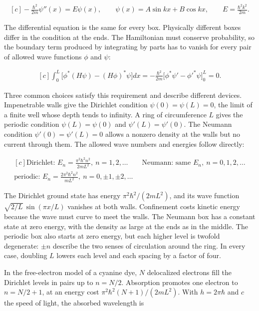 \documentclass[11pt,oneside]{book}
\newenvironment{centeredalign}{\[\begin{gathered}[c]}{\end{gathered}\]}
\begin{document}
\begin{centeredalign}
-\frac{\hbar^2}{2m}\psi''(x)=E\psi(x),\qquad
\psi(x)=A\sin kx+B\cos kx,\qquad E=\frac{\hbar^2k^2}{2m}.
\end{centeredalign}

The differential equation is the same for every box. Physically different boxes differ in the condition at the ends. The Hamiltonian must conserve probability, so the boundary term produced by integrating by parts has to vanish for every pair of allowed wave functions \(\phi\) and \(\psi\):

\begin{centeredalign}
\int_0^L\big[\phi^*(H\psi)-(H\phi)^*\psi\big]dx
=-\frac{\hbar^2}{2m}\Big[\phi^*\psi'-\phi'^*\psi\Big]_0^L=0.
\end{centeredalign}

Three common choices satisfy this requirement and describe different devices. Impenetrable walls give the Dirichlet condition \(\psi(0)=\psi(L)=0\), the limit of a finite well whose depth tends to infinity. A ring of circumference \(L\) gives the periodic condition \(\psi(L)=\psi(0)\) and \(\psi'(L)=\psi'(0)\). The Neumann condition \(\psi'(0)=\psi'(L)=0\) allows a nonzero density at the walls but no current through them. The allowed wave numbers and energies follow directly:

\begin{centeredalign}
\text{Dirichlet: }E_n=\frac{\pi^2\hbar^2n^2}{2mL^2},\ n=1,2,\dots\qquad
\text{Neumann: same }E_n,\ n=0,1,2,\dots\\
\text{periodic: }E_n=\frac{2\pi^2\hbar^2n^2}{mL^2},\ n=0,\pm1,\pm2,\dots
\end{centeredalign}

The Dirichlet ground state has energy \(\pi^2\hbar^2/(2mL^2)\), and its wave function \(\sqrt{2/L}\,\sin(\pi x/L)\) vanishes at both walls. Confinement costs kinetic energy because the wave must curve to meet the walls. The Neumann box has a constant state at zero energy, with the density as large at the ends as in the middle. The periodic box also starts at zero energy, but each higher level is twofold degenerate: \(\pm n\) describe the two senses of circulation around the ring. In every case, doubling \(L\) lowers each level and each spacing by a factor of four.

In the free-electron model of a cyanine dye, \(N\) delocalized electrons fill the Dirichlet levels in pairs up to \(n=N/2\). Absorption promotes one electron to \(n=N/2+1\), at an energy cost \(\pi^2\hbar^2(N+1)/(2mL^2)\). With \(h=2\pi\hbar\) and \(c\) the speed of light, the absorbed wavelength is
\end{document}
